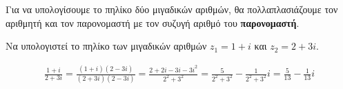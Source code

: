 
\begin{rem}
  Για να υπολογίσουμε το πηλίκο δύο μιγαδικών αριθμών, θα πολλαπλασιάζουμε τον αριθμητή
  και τον παρονομαστή με τον συζυγή αριθμό του \textbf{παρονομαστή}.
\end{rem}
\begin{example} 
  Να υπολογιστεί το πηλίκο των μιγαδικών αριθμών $ z_{1}=1+i $ και $ z_{2}=2+3i $.
\end{example}
\begin{solution}
  \begin{align*}
    \frac{1+i}{2+3i} = \frac{(1+i)(2-3i)}{(2+3i)(2-3i)} =
    \frac{2+2i-3i-3i^{2}}{2^{2}+3^{2}} = \frac{5}{2^{2}+3^{2}} - 
    \frac{1}{2^{2}+3^{2}}i = \frac{5}{13} - \frac{1}{13} i
  \end{align*}
\end{solution}


\vspace{\baselineskip}

